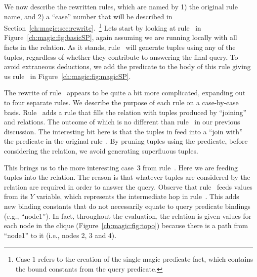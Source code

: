 We now describe the rewritten rules, which are named by 1) the original rule
name, and 2) a ``case'' number that will be described in
Section~\ref{ch:magic:sec:rewrite}.~\footnote{Case 1 refers to the creation of
the single magic predicate  fact, which contains the bound
constants from the query predicate.} Lets start by looking at rule~ in
Figure~\ref{ch:magic:fig:basicSP}, again assuming we are running locally with
all facts in the  relation.  As it stands, rule~ will generate
 tuples using any of the  tuples, regardless of whether they
contribute to answering the final query.  To avoid extraneous deductions, we
add the  predicate to the body of this rule giving us
rule~ in Figure~\ref{ch:magic:fig:magicSP}.

The rewrite of rule~ appears to be quite a bit more complicated,
expanding out to four separate rules.  We describe the purpose of each rule on
a case-by-case basis.  Rule~ adds a rule that fills the
 relation with tuples produced by ``joining'' 
and  relations.  The outcome of which is no different than
rule~ in our previous discussion.  The interesting bit here is
that the tuples in  feed into a ``join with'' the 
predicate in the original rule~.  By pruning tuples using the
 predicate, before considering the  relation, we avoid
generating superfluous tuples.

This brings us to the more interesting case~$3$ from rule~.  Here we are
feeding  tuples into the  relation.  The reason
is that whatever tuples are considered by the  relation are required
in order to answer the query.  Observe that rule~ feeds
 values from its $Y$ variable, which represents the
intermediate hop in rule~.  This adds new binding constants that do not
necessarily equate to query predicate bindings (e.g., ``node1'').  In fact,
throughout the evaluation, the  relation is given values for
each node in the clique (Figure~\ref{ch:magic:fig:topo}) because there is a
path from ``node1'' to it (i.e., nodes 2, 3 and 4).

